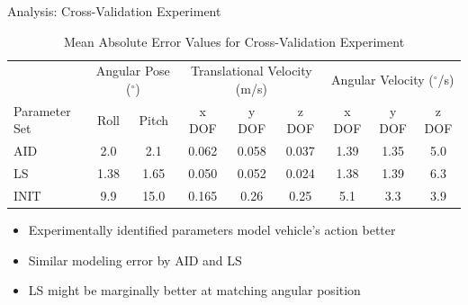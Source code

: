 \begin{frame}{Analysis: Cross-Validation Experiment}

{ \scriptsize
\begin{table}[htbp]
\caption{Mean Absolute Error Values for Cross-Validation Experiment}
\begin{center}
\begin{tabular}{p{1.5cm}|cccccccc}
 & \multicolumn{2}{c}{Angular Pose ($^\circ$)} & \multicolumn{3}{c}{Translational Velocity (m/s) }& \multicolumn{3}{c}{Angular Velocity ($^\circ$/s)} \\ 
Parameter Set & Roll & Pitch & x DOF & y DOF & z DOF & x DOF & y DOF & z DOF \\ \hline
AID  &  2.0 & 2.1 & 0.062  & 0.058  & 0.037  & 1.39 & 1.35 & 5.0 \\
LS   &  1.38 & 1.65 & 0.050  & 0.052 & 0.024  & 1.38 & 1.39 & 6.3 \\
INIT & 9.9 & 15.0 & 0.165  & 0.26  & 0.25 & 5.1 & 3.3 & 3.9 \\
\end{tabular}
\end{center}
\end{table}
}
 \begin{itemize}
   \item<2-> Experimentally identified parameters model vehicle's action better 
   \item<3-> Similar modeling error by AID and LS
   \item<4-> LS might be marginally better at matching angular position
 \end{itemize}

\end{frame}


